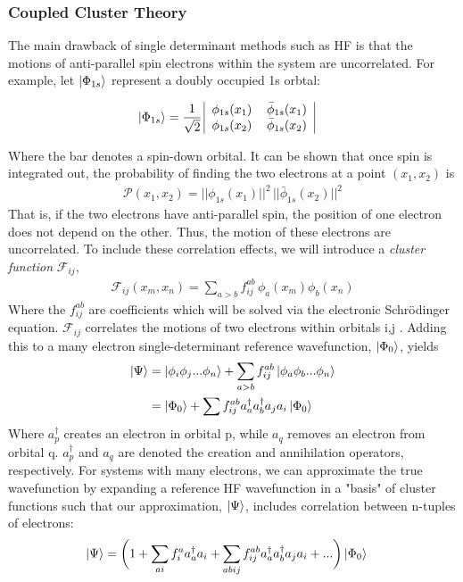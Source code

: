 \documentclass[letterpaper, 12pt]{article}
\newcommand{\adag}{a^{\dagger}} %
\begin{document}
\subsubsection{Coupled Cluster Theory}
The main drawback of single determinant methods such as HF is that the motions of anti-parallel spin electrons within the system are uncorrelated. For example, let $\ket{\Phi_{1s}}$ represent a doubly occupied 1s orbtal:

\begin{align}
\ket{\Phi_{1s}}&=\frac{1}{\sqrt{2}} \,
\begin{tabular}{|c c|}
$\phi_{1s}(x_1)$ & $\bar{\phi}_{1s}(x_1)$ \\
$\phi_{1s}(x_2)$ & $\bar{\phi}_{1s}(x_2)$\\
\end{tabular}
\end{align}

Where the bar denotes a spin-down orbital. It can be shown \cite{SO}
that once spin is integrated out, the probability of finding the two electrons at a point $(x_1,x_2)$ is \begin{align}
\mathcal{P}(x_1, x_2)= ||\phi_{1s}(x_1)||^2 \, ||\bar{\phi}_{1s}(x_2) ||^2
\end{align}
That is, if the two electrons have anti-parallel spin, the position of one electron does not depend on the other. Thus, the motion of these electrons are uncorrelated. To include these correlation effects, we will introduce a \textit{cluster function} $\mathcal{F}_{ij}$,  
\begin{align}
\mathcal{F}_{ij}(x_m, x_n) = \sum_{a>b} f^{ab}_{ij} \, \phi_a(x_m) \phi_b(x_n) 
\end{align}
Where the $f^{ab}_{ij}$ are coefficients which will be solved via the electronic  Schr\"{o}dinger equation. $\mathcal{F}_{ij}$ correlates the motions of two electrons within orbitals i,j \cite{reviews}. Adding this to a many electron single-determinant reference wavefunction, $\ket{\Phi_{0}}$, yields
\begin{align}
\ket{\Psi}&= \ket{\phi_i \phi_j... \phi_n} +
 \sum_{a>b} f^{ab}_{ij} \ket{\phi_a\phi_b ... \phi_n}\\
 &= \ket{\Phi_{0}} + \sum f^{ab}_{ij} \adag_a \adag_b a_j a_i\ket{\Phi_{0}} 
\end{align}
Where $a^\dagger_p$ creates an electron in orbital p, while $a_q$ removes an electron from orbital q. $a^\dagger_p$ and $a_q$ are denoted the creation and annihilation operators, respectively. For systems with many electrons, we can approximate the true wavefunction by expanding a reference HF wavefunction in a "basis" of cluster functions such that our approximation, $\ket{\Psi}$, includes correlation between n-tuples of electrons:
\begin{align}
\ket{\Psi}&=  \bigg(1 +\sum_{ai} f^a_i \adag_a a_i + \sum_{abij} f^{ab}_{ij} \adag_a \adag_b a_j a_i  +...\bigg) \ket{\Phi_{0}} \label{eq:cluster}
\end{align}
\end{document}
